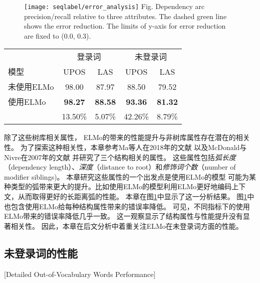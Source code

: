 \begin{figure}[t]
	\centering
	\texttt{[image: seqlabel/error\_analysis]}
	{Fig. $\!$}{Dependency arc precision/recall relative to three attributes.
		The dashed green line shows the error reduction.
		The limits of y-axis for error reduction are fixed to (0.0, 0.3).\label{fig:seq:error_analysis}}
\end{figure}

\begin{table}[t]
	\vspace{0.5em}\centering\wuhao
	\begin{tabular}{lcccc}
		\toprule[1.5pt]
		& \multicolumn{2}{c}{登录词} & \multicolumn{2}{c}{未登录词}  \\
		模型 & UPOS & LAS & UPOS & LAS  \\
		\midrule[1pt]
		未使用ELMo & 98.00 & 87.97 & 88.50 & 79.52 \\
		使用ELMo & \textbf{98.27} & \textbf{88.58} & \textbf{93.36} & \textbf{81.32} \\
		& 13.50\% & 5.07\%& 42.26\% & 8.79\%\\
		\bottomrule[1.5pt]
	\end{tabular}
\end{table}

除了这些树库相关属性，
ELMo的带来的性能提升与非树库属性存在潜在的相关性。
为了探索这种相关性，本章参考Ma等人在2018年的文献
以及McDonald与Nivre在2007年的文献
并研究了三个结构相关的属性。
这些属性包括\textit{弧长度}（dependency length）、\textit{深度}（distance to root）和\textit{修饰词个数}（number of modifier siblings)。 
本章研究这些属性的一个出发点是使用ELMo的模型
可能为某种类型的弧带来更大的提升。比如使用ELMo的模型利用ELMo更好地编码上下文，从而取得更好的长距离弧的性能。
本章在图\ref{fig:seq:error_analysis}中显示了这一分析结果。
图\ref{fig:seq:error_analysis}中也包含使用ELMo给每种结构属性带来的错误率降低。
可见，不同指标下的使用ELMo带来的错误率降低几乎一致。
这一观察显示了结构属性与性能提升没有显著相关性。
因此，本章在后文分析中着重关注ELMo在未登录词方面的性能。

\subsection{未登录词的性能}[Detailed Out-of-Vocabulary Words Performance]

